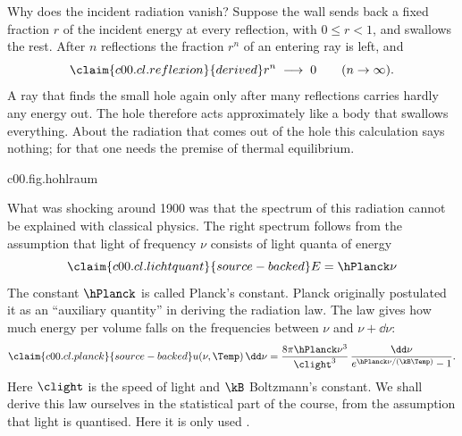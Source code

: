 Why does the incident radiation vanish? Suppose the wall sends back a fixed fraction $r$ of the
incident energy at every reflection, with $0 \leq r < 1$, and swallows the rest. After $n$
reflections the fraction $r^n$ of an entering ray is left, and
\begin{equation}\label{c00.eq.reflexion}\claim{c00.cl.reflexion}{derived}
  r^n \;\longrightarrow\; 0
  \qquad (n \to \infty) .
\end{equation}
A ray that finds the small hole again only after many reflections carries hardly any energy
out. The hole therefore acts approximately like a body that swallows everything. About the
radiation that comes out of the hole this calculation says nothing; for that one needs the
premise of thermal equilibrium.

\begin{tpcfigure}{c00.fig.hohlraum}
  \caption{A black body as a box with a small hole. Drawn are the first reflections of an
    entering ray according to the law of reflection; none of them hits the hole. If the
    wall keeps the fraction $1 - r$ of the energy at every reflection, only the fraction
    $r^n$ is left after $n$ reflections, equation~\eqref{c00.eq.reflexion}.}
\end{tpcfigure}

What was shocking around 1900 was that the spectrum of this radiation cannot be explained
with classical physics. The right spectrum follows from the assumption that light of
frequency $\nu$ consists of light quanta of energy
\begin{equation}\label{c00.eq.lichtquant}\claim{c00.cl.lichtquant}{source-backed}
  E = \hPlanck \nu
\end{equation}
The constant $\hPlanck$ is called Planck's constant. Planck originally postulated it as an
“auxiliary quantity” in deriving the radiation law. The law gives how much energy per volume
falls on the frequencies between $\nu$ and $\nu + \dd\nu$:
\begin{equation}\label{c00.eq.planck}\claim{c00.cl.planck}{source-backed}
  u(\nu, \Temp)\,\dd\nu
  = \frac{8\pi \hPlanck \nu^3}{\clight^3}\,\frac{\dd\nu}{e^{\hPlanck\nu/(\kB \Temp)} - 1} .
\end{equation}
Here $\clight$ is the speed of light and $\kB$ Boltzmann's constant. We shall derive this law
ourselves in the statistical part of the course, from the assumption that light is
quantised. Here it is only used .

